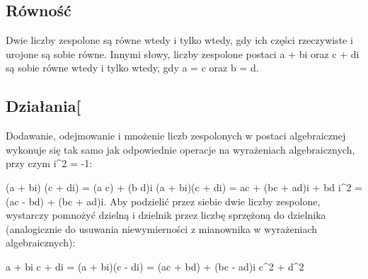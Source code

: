 \documentclass[a4paper,11pt]{article}
\begin{document}
\subsection{Równość}
Dwie liczby zespolone są równe wtedy i tylko wtedy, gdy ich części rzeczywiste i urojone są sobie równe. Innymi słowy, liczby zespolone postaci a + bi\; oraz c + di\; są sobie równe wtedy i tylko wtedy, gdy a = c\; oraz b = d\;.

\subsection{Działania[}
Dodawanie, odejmowanie i mnożenie liczb zespolonych w postaci algebraicznej wykonuje się tak samo jak odpowiednie operacje na wyrażeniach algebraicznych, przy czym i^2 = -1:\;

(a + bi) \pm (c + di) = (a \pm c) + (b \pm d)i\;
(a + bi)(c + di) = ac + (bc + ad)i + bd i^2 = (ac - bd) + (bc + ad)i\;.
Aby podzielić przez siebie dwie liczby zespolone, wystarczy pomnożyć dzielną i dzielnik przez liczbę sprzężoną do dzielnika (analogicznie do usuwania niewymierności z mianownika w wyrażeniach algebraicznych):

{a + bi \over c + di} = {(a + bi)(c - di) } = {(ac + bd) + (bc - ad)i \over c^2 + d^2}
\end{document}
